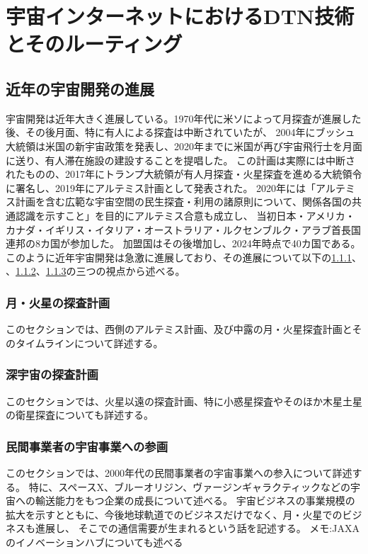 \chapter{宇宙インターネットにおけるDTN技術とそのルーティング}
\label{chap:prerequisite_knowledge}

\section{近年の宇宙開発の進展}
宇宙開発は近年大きく進展している。1970年代に米ソによって月探査が進展した後、その後月面、特に有人による探査は中断されていたが、
2004年にブッシュ大統領は米国の新宇宙政策を発表し、2020年までに米国が再び宇宙飛行士を月面に送り、有人滞在施設の建設することを提唱した。\cite{久保田2009}
この計画は実際には中断されたものの、2017年にトランプ大統領が有人月探査・火星探査を進める大統領令に署名し、2019年にアルテミス計画として発表された。\cite{nasa2020}
2020年には「アルテミス計画を含む広範な宇宙空間の民生探査・利用の諸原則について、関係各国の共通認識を示すこと」を目的にアルテミス合意\cite{artemis_agreement1}も成立し、
当初日本・アメリカ・カナダ・イギリス・イタリア・オーストラリア・ルクセンブルク・アラブ首長国連邦の8カ国が参加した。\cite{artemis_agreement2}
加盟国はその後増加し、2024年時点で40カ国である。\cite{artemis_agreement3}
このように近年宇宙開発は急激に進展しており、その進展について以下の\ref{月・火星の探査計画}、
、\ref{深宇宙の探査計画}、\ref{民間事業者の宇宙事業への参画}の三つの視点から述べる。


\subsection{月・火星の探査計画}
\label{月・火星の探査計画}
このセクションでは、西側のアルテミス計画、及び中露の月・火星探査計画とそのタイムラインについて詳述する。

\subsection{深宇宙の探査計画}
\label{深宇宙の探査計画}
このセクションでは、火星以遠の探査計画、特に小惑星探査やそのほか木星土星の衛星探査についても詳述する。

\subsection{民間事業者の宇宙事業への参画}
\label{民間事業者の宇宙事業への参画}
このセクションでは、2000年代の民間事業者の宇宙事業への参入について詳述する。
特に、スペースX、ブルーオリジン、ヴァージンギャラクティックなどの宇宙への輸送能力をもつ企業の成長について述べる。
宇宙ビジネスの事業規模の拡大を示すとともに、今後地球軌道でのビジネスだけでなく、月・火星でのビジネスも進展し、
そこでの通信需要が生まれるという話を記述する。
メモ:JAXAのイノベーションハブについても述べる


